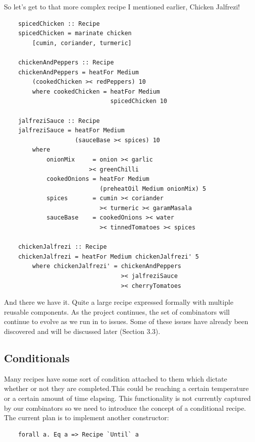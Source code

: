 \documentclass[11pt]{article}
\begin{document}
    So let's get to that more complex recipe I mentioned earlier, Chicken Jalfrezi!
    \begin{tt}
    \small
    \begin{lstlisting}
    spicedChicken :: Recipe
    spicedChicken = marinate chicken
        [cumin, coriander, turmeric]

    chickenAndPeppers :: Recipe
    chickenAndPeppers = heatFor Medium
        (cookedChicken >< redPeppers) 10
        where cookedChicken = heatFor Medium
                              spicedChicken 10

    jalfreziSauce :: Recipe
    jalfreziSauce = heatFor Medium
                    (sauceBase >< spices) 10
        where
            onionMix     = onion >< garlic
                        >< greenChilli
            cookedOnions = heatFor Medium
                           (preheatOil Medium onionMix) 5
            spices       = cumin >< coriander
                           >< turmeric >< garamMasala
            sauceBase    = cookedOnions >< water
                           >< tinnedTomatoes >< spices

    chickenJalfrezi :: Recipe
    chickenJalfrezi = heatFor Medium chickenJalfrezi' 5
        where chickenJalfrezi' = chickenAndPeppers
                                 >< jalfreziSauce
                                 >< cherryTomatoes
    \end{lstlisting}
    \end{tt}
    And there we have it. Quite a large recipe expressed formally with
    multiple reusable components. As the project continues, the set of
    combinators will continue to evolve as we run in to issues. Some of
    these issues have already been discovered and will be discussed later
    (Section 3.3).

    \subsection{Conditionals}

    Many recipes have some sort of condition attached to them which dictate
    whether or not they are completed.This could be reaching a certain
    temperature or a certain amount of time elapsing. This functionality
    is not currently captured by our combinators so we need to introduce
    the concept of a conditional recipe. The current plan is to implement
    another constructor:

    \begin{tt}
    \small
    \begin{lstlisting}
    forall a. Eq a => Recipe `Until` a
    \end{lstlisting}
    \end{tt}
\end{document}
